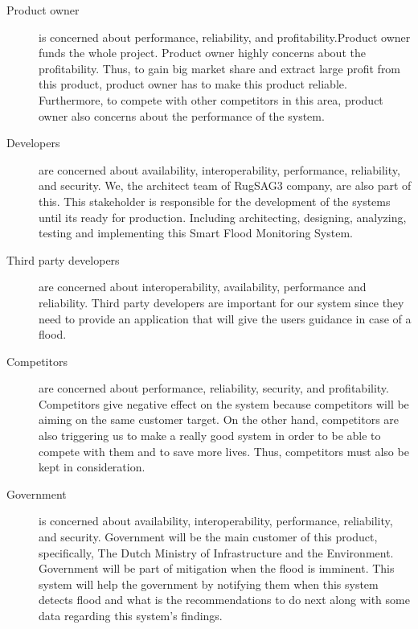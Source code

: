 
\begin{description}
\item[Product owner] is concerned about performance, reliability, and profitability.Product owner funds the whole project. Product owner highly concerns about the profitability. Thus, to gain big market share and extract large profit from this product, product owner has to make this product reliable. Furthermore, to compete with other competitors in this area, product owner also concerns about the performance of the system.
\item[Developers] are concerned about availability, interoperability, performance, reliability, and security. We, the architect team of RugSAG3 company, are also part of this. This stakeholder is responsible for the development of the systems until its ready for production. Including architecting, designing, analyzing, testing and implementing this Smart Flood Monitoring System.
\item[Third party developers] are concerned about interoperability, availability, performance and reliability. Third party developers are important for our system since they need to provide an application that will give the users guidance in case of a flood.
\item[Competitors] are concerned about performance, reliability, security, and profitability. Competitors give negative effect on the system because competitors will be aiming on the same customer target. On the other hand, competitors are also triggering us to make a really good system in order to be able to compete with them and to save more lives. Thus, competitors must also be kept in consideration.
\item[Government] is concerned about availability, interoperability, performance, reliability, and security. Government will be the main customer of this product, specifically, The Dutch Ministry of Infrastructure and the Environment. Government will be part of mitigation when the flood is imminent. This system will help the government by notifying them when this system detects flood and what is the recommendations to do next along with some data regarding this system's findings.

\end{description}
